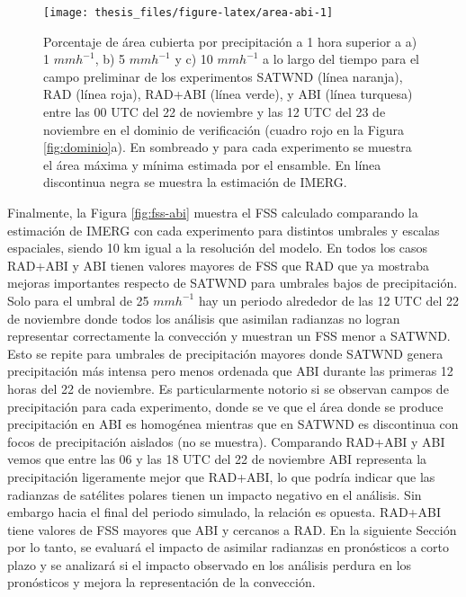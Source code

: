 \documentclass[12pt,oneside,a4paper]{reedthesis}
\begin{document}
\begin{figure}
\texttt{[image: thesis\_files/figure-latex/area-abi-1]} \caption{Porcentaje de área cubierta por precipitación a 1 hora superior a a) 1 \(mmh^{-1}\), b) 5 \(mmh^{-1}\) y c) 10 \(mmh^{-1}\) a lo largo del tiempo para el campo preliminar de los experimentos SATWND (línea naranja), RAD (línea roja), RAD+ABI (línea verde), y ABI (línea turquesa) entre las 00 UTC del 22 de noviembre y las 12 UTC del 23 de noviembre en el dominio de verificación (cuadro rojo en la Figura \ref{fig:dominio}a). En sombreado y para cada experimento se muestra el área máxima y mínima estimada por el ensamble. En línea discontinua negra se muestra la estimación de IMERG.}\label{fig:area-abi}
\end{figure}
Finalmente, la Figura \ref{fig:fss-abi} muestra el FSS calculado comparando la estimación de IMERG con cada experimento para distintos umbrales y escalas espaciales, siendo 10 km igual a la resolución del modelo. En todos los casos RAD+ABI y ABI tienen valores mayores de FSS que RAD que ya mostraba mejoras importantes respecto de SATWND para umbrales bajos de precipitación. Solo para el umbral de 25 \(mmh^{-1}\) hay un periodo alrededor de las 12 UTC del 22 de noviembre donde todos los análisis que asimilan radianzas no logran representar correctamente la convección y muestran un FSS menor a SATWND. Esto se repite para umbrales de precipitación mayores donde SATWND genera precipitación más intensa pero menos ordenada que ABI durante las primeras 12 horas del 22 de noviembre. Es particularmente notorio si se observan campos de precipitación para cada experimento, donde se ve que el área donde se produce precipitación en ABI es homogénea mientras que en SATWND es discontinua con focos de precipitación aislados (no se muestra). Comparando RAD+ABI y ABI vemos que entre las 06 y las 18 UTC del 22 de noviembre ABI representa la precipitación ligeramente mejor que RAD+ABI, lo que podría indicar que las radianzas de satélites polares tienen un impacto negativo en el análisis. Sin embargo hacia el final del periodo simulado, la relación es opuesta. RAD+ABI tiene valores de FSS mayores que ABI y cercanos a RAD. En la siguiente Sección por lo tanto, se evaluará el impacto de asimilar radianzas en pronósticos a corto plazo y se analizará si el impacto observado en los análisis perdura en los pronósticos y mejora la representación de la convección.
\end{document}
